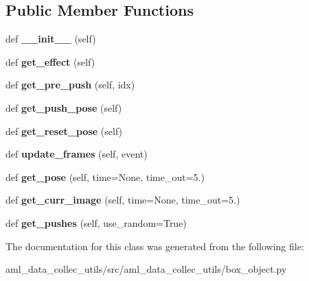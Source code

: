 \subsection*{Public Member Functions}
\begin{DoxyCompactItemize}
\item 
\hypertarget{classaml__data__collec__utils_1_1box__object_1_1_box_object_ac77da9a41411265b2cfbb4d031f5b30d}{}\label{classaml__data__collec__utils_1_1box__object_1_1_box_object_ac77da9a41411265b2cfbb4d031f5b30d} 
def {\bfseries \+\_\+\+\_\+init\+\_\+\+\_\+} (self)
\item 
\hypertarget{classaml__data__collec__utils_1_1box__object_1_1_box_object_af92e7acabc26299f77a5e95241806aff}{}\label{classaml__data__collec__utils_1_1box__object_1_1_box_object_af92e7acabc26299f77a5e95241806aff} 
def {\bfseries get\+\_\+effect} (self)
\item 
\hypertarget{classaml__data__collec__utils_1_1box__object_1_1_box_object_a48d3533233409e3943d143ff25d91e97}{}\label{classaml__data__collec__utils_1_1box__object_1_1_box_object_a48d3533233409e3943d143ff25d91e97} 
def {\bfseries get\+\_\+pre\+\_\+push} (self, idx)
\item 
\hypertarget{classaml__data__collec__utils_1_1box__object_1_1_box_object_a73ea10df4cc42b1ac2052172c4ad957d}{}\label{classaml__data__collec__utils_1_1box__object_1_1_box_object_a73ea10df4cc42b1ac2052172c4ad957d} 
def {\bfseries get\+\_\+push\+\_\+pose} (self)
\item 
\hypertarget{classaml__data__collec__utils_1_1box__object_1_1_box_object_a47ae6d569ccd211a6353de2a687034d2}{}\label{classaml__data__collec__utils_1_1box__object_1_1_box_object_a47ae6d569ccd211a6353de2a687034d2} 
def {\bfseries get\+\_\+reset\+\_\+pose} (self)
\item 
\hypertarget{classaml__data__collec__utils_1_1box__object_1_1_box_object_af6a670b7ccc37bc3b7a910010167b6fc}{}\label{classaml__data__collec__utils_1_1box__object_1_1_box_object_af6a670b7ccc37bc3b7a910010167b6fc} 
def {\bfseries update\+\_\+frames} (self, event)
\item 
\hypertarget{classaml__data__collec__utils_1_1box__object_1_1_box_object_a54e242c8ce4f643cab1448da5beac4f8}{}\label{classaml__data__collec__utils_1_1box__object_1_1_box_object_a54e242c8ce4f643cab1448da5beac4f8} 
def {\bfseries get\+\_\+pose} (self, time=None, time\+\_\+out=5.)
\item 
\hypertarget{classaml__data__collec__utils_1_1box__object_1_1_box_object_af55d698d891e6e6c83dea2c1ecf41d8a}{}\label{classaml__data__collec__utils_1_1box__object_1_1_box_object_af55d698d891e6e6c83dea2c1ecf41d8a} 
def {\bfseries get\+\_\+curr\+\_\+image} (self, time=None, time\+\_\+out=5.)
\item 
\hypertarget{classaml__data__collec__utils_1_1box__object_1_1_box_object_a51011584bfe914e45803fdc05109613c}{}\label{classaml__data__collec__utils_1_1box__object_1_1_box_object_a51011584bfe914e45803fdc05109613c} 
def {\bfseries get\+\_\+pushes} (self, use\+\_\+random=True)
\end{DoxyCompactItemize}


The documentation for this class was generated from the following file\+:\begin{DoxyCompactItemize}
\item 
aml\+\_\+data\+\_\+collec\+\_\+utils/src/aml\+\_\+data\+\_\+collec\+\_\+utils/box\+\_\+object.\+py\end{DoxyCompactItemize}
